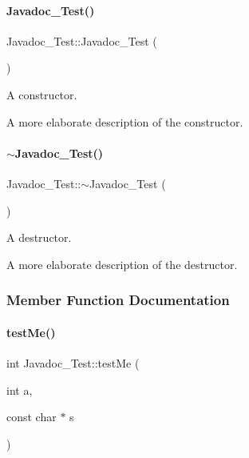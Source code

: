 \paragraph{\texorpdfstring{Javadoc\+\_\+\+Test()}{Javadoc\_Test()}}
{\footnotesize\ttfamily Javadoc\+\_\+\+Test\+::\+Javadoc\+\_\+\+Test (\begin{DoxyParamCaption}{ }\end{DoxyParamCaption})}



A constructor. 

A more elaborate description of the constructor. \mbox{\label{class_javadoc___test_a60016cd15a4ed82bbc35be79a0a6a6b5}} 
\paragraph{\texorpdfstring{$\sim$\+Javadoc\+\_\+\+Test()}{~Javadoc\_Test()}}
{\footnotesize\ttfamily Javadoc\+\_\+\+Test\+::$\sim$\+Javadoc\+\_\+\+Test (\begin{DoxyParamCaption}{ }\end{DoxyParamCaption})}



A destructor. 

A more elaborate description of the destructor. 

\subsubsection{Member Function Documentation}
\mbox{\label{class_javadoc___test_a0c472683ed25ff096e8a9edfb18d550c}} 
\paragraph{\texorpdfstring{test\+Me()}{testMe()}}
{\footnotesize\ttfamily int Javadoc\+\_\+\+Test\+::test\+Me (\begin{DoxyParamCaption}\item[{int}]{a,  }\item[{const char $\ast$}]{s }\end{DoxyParamCaption})}



